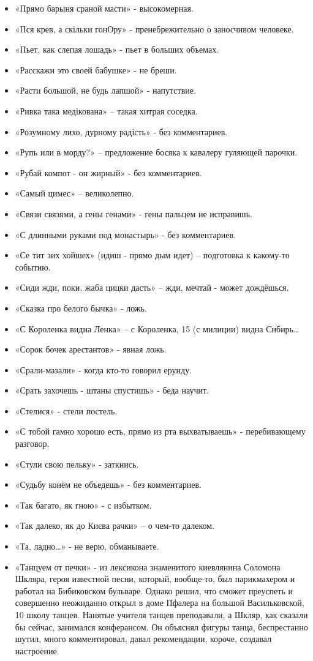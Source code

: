 \begin{itemize}
\item  «Прямо барыня сраной масти» - высокомерная.
\item  «Пся крев, а скільки гонОру» - пренебрежительно о заносчивом человеке.
\item  «Пьет, как слепая лошадь» - пьет в больших объемах.
\item  «Расскажи это своей бабушке» - не бреши.
\item  «Расти большой, не будь лапшой» - напутствие.
\item  «Ривка така медікована» – такая хитрая соседка.
\item  «Розумному лихо, дурному радість» - без комментариев.
\item  «Рупь или в морду?» – предложение босяка к кавалеру гуляющей парочки.
\item  «Рубай компот - он жирный» - без комментариев.
\item  «Самый цимес» – великолепно.
\item  «Связи связями, а гены генами» - гены пальцем не исправишь.
\item  «С длинными руками под монастырь» - без комментариев.
\item  «Се тит зих хойшех» (идиш - прямо дым идет) – подготовка к какому-то 
событию.
\item  «Сиди жди, поки, жаба цицки дасть» – жди, мечтай - может дождёшься.
\item  «Сказка про белого бычка»  - ложь.
\item  «С Короленка видна Ленка» – с Короленка, 15 (с милиции) видна Сибирь…
\item  «Сорок бочек арестантов» - явная ложь.
\item  «Срали-мазали» - когда кто-то говорил ерунду.
\item  «Срать захочешь - штаны спустишь» - беда научит.
\item  «Стелися» - стели постель.
\item  «С тобой гамно хорошо есть, прямо из рта выхватываешь» - перебивающему разговор.
\item  «Стули свою пельку» - заткнись.
\item  «Судьбу конём не объедешь» - без комментариев.
\item  «Так багато, як гною» - с избытком.
\item  «Так далеко, як до Києва рачки» – о чем-то далеком.
\item  «Та, ладно…» - не верю, обманываете.
\item  «Танцуем от печки» - из лексикона знаменитого киевлянина Соломона Шкляра, героя известной песни, который, вообще-то, был парикмахером и работал на Бибиковском бульваре. Однако решил, что сможет преуспеть и совершенно неожиданно открыл в доме Пфалера на большой Васильковской, 10 школу танцев. Нанятые учителя танцев преподавали, а Шкляр, как сказали бы сейчас, занимался конферансом. Он объяснял фигуры танца, беспрестанно шутил, много комментировал, давал рекомендации, короче, создавал настроение. 

\end{itemize}
